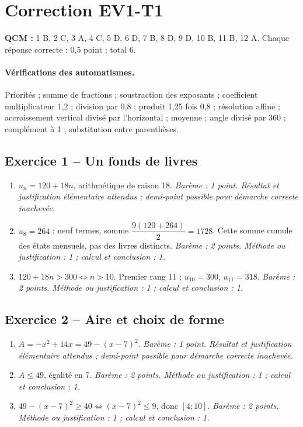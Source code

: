 \clearpage\section*{Correction EV1-T1}\label{EV1-T1-CORR}
\textbf{QCM :} 1 B, 2 C, 3 A, 4 C, 5 D, 6 D, 7 B, 8 D, 9 D, 10 B, 11 B, 12 A. Chaque réponse correcte : 0,5 point ; total 6.
\paragraph{Vérifications des automatismes.} Priorités ; somme de fractions ; soustraction des exposants ; coefficient multiplicateur 1,2 ; division par 0,8 ; produit 1,25 fois 0,8 ; résolution affine ; accroissement vertical divisé par l’horizontal ; moyenne ; angle divisé par 360 ; complément à 1 ; substitution entre parenthèses.
\subsection*{Exercice 1 -- Un fonds de livres}
\begin{enumerate}
\item $u_n=120+18n$, arithmétique de raison 18. \textit{Barème : 1 point. Résultat et justification élémentaire attendus ; demi-point possible pour démarche correcte inachevée.}
\item $u_8=264$ ; neuf termes, somme $\dfrac{9(120+264)}{2}=1728$. Cette somme cumule des états mensuels, pas des livres distincts. \textit{Barème : 2 points. Méthode ou justification : 1 ; calcul et conclusion : 1.}
\item $120+18n>300\iff n>10$. Premier rang 11 ; $u_{10}=300$, $u_{11}=318$. \textit{Barème : 2 points. Méthode ou justification : 1 ; calcul et conclusion : 1.}
\end{enumerate}
\subsection*{Exercice 2 -- Aire et choix de forme}
\begin{enumerate}
\item $A=-x^2+14x=49-(x-7)^2$. \textit{Barème : 1 point. Résultat et justification élémentaire attendus ; demi-point possible pour démarche correcte inachevée.}
\item $A\leq49$, égalité en 7. \textit{Barème : 2 points. Méthode ou justification : 1 ; calcul et conclusion : 1.}
\item $49-(x-7)^2\geq40\iff(x-7)^2\leq9$, donc $[4;10]$. \textit{Barème : 2 points. Méthode ou justification : 1 ; calcul et conclusion : 1.}
\end{enumerate}
